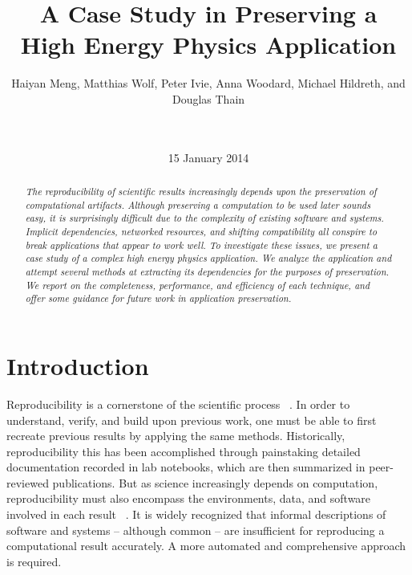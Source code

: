 \documentclass{sig-alternate}
\begin{document}
\title{A Case Study in Preserving a\\High Energy Physics Application}
\author{
Haiyan Meng, Matthias Wolf, Peter Ivie, Anna Woodard, Michael Hildreth, and Douglas Thain\\
\\
\\
}
\date{15 January 2014}
\maketitle

\begin{abstract}
\it The reproducibility of scientific results increasingly
depends upon the preservation of computational artifacts.
Although preserving a computation to be used later sounds
easy, it is surprisingly difficult due to the complexity
of existing software and systems.  Implicit dependencies,
networked resources, and shifting compatibility all conspire
to break applications that appear to work well.  To investigate
these issues, we present a case study of a complex high energy
physics application.  We analyze the application and attempt
several methods at extracting its dependencies for the purposes
of preservation.  We report on the completeness, performance,
and efficiency of each technique, and offer some guidance for
future work in application preservation.
\end{abstract}



\section{Introduction}

Reproducibility is a cornerstone of the scientific process ~\cite{borgman2012data}.
In order to understand, verify, and build upon previous work,
one must be able to first recreate previous results by applying
the same methods. Historically, reproducibility this has been
accomplished through painstaking detailed documentation recorded
in lab notebooks, which are then summarized in peer-reviewed publications.
But as science increasingly depends on computation,
reproducibility must also encompass the environments, data, and software
involved in each result ~\cite{zabolitzky2002preserving}. It is widely recognized that informal
descriptions of software and systems -- although common -- are insufficient
for reproducing a computational result accurately.
A more automated and comprehensive approach is required.
\end{document}
